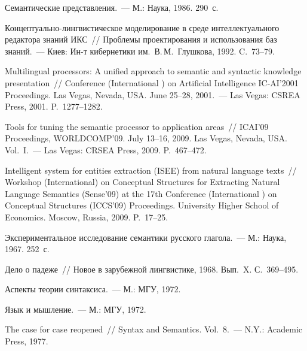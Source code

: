 \begin{multicols}{2}
{\small\frenchspacing
{%
\begin{thebibliography}{99}

     Семантические представления.~--- М.: Наука, 1986. 290~с.
     
     Кон\-цеп\-ту\-аль\-но-линг\-вис\-ти\-че\-ское моделирование в среде 
интеллектуального редактора знаний ИКС~// Проблемы проектирования и 
использования баз знаний.~--- Киев: Ин-т кибернетики им.\ В.\,М.~Глушкова, 
1992. C.~73--79.
     
     Multilingual processors: A unified approach to semantic and syntactic 
knowledge presentation~// Conference (International ) on Artificial Intelligence 
IC-AI'2001 Proceedings. Las Vegas, Nevada, USA. June 25--28, 2001.~--- Las 
Vegas: CSREA Press, 2001. P.~1277--1282.

     Tools for tuning the semantic processor to application areas~// ICAI'09 
Proceedings, WORLDCOMP'09. July 13--16, 2009. Las Vegas, Nevada, USA. 
Vol.~I.~--- Las Vegas: CRSEA Press, 2009. P.~467--472.
     
     Intelligent system for entities extraction (ISEE) from natural language 
texts~// Workshop (International) on Conceptual Structures for Extracting Natural 
Language Semantics (Sense'09) at the 17th Conference 
(International ) on Conceptual Structures (ICCS'09) Proceedings. University Higher School of 
Economics. Moscow, Russia, 2009. P.~17--25.
     
     Экспериментальное исследование семантики русского глагола.~--- М.: 
Наука, 1967.  252~с.
     
     Дело о падеже~// Новое в зарубежной линг\-вистике, 1968. Вып.~X. С.~369--495.
     
     Аспекты теории синтаксиса.~--- М.: МГУ, 1972.
     
     Язык и мышление.~--- М.: МГУ, 1972.
     
     
     The case for case reopened~// Syntax and Semantics. Vol.~8.~--- N.Y.: 
Academic Press, 1977. 
     


\end{thebibliography}}}
\end{multicols}
